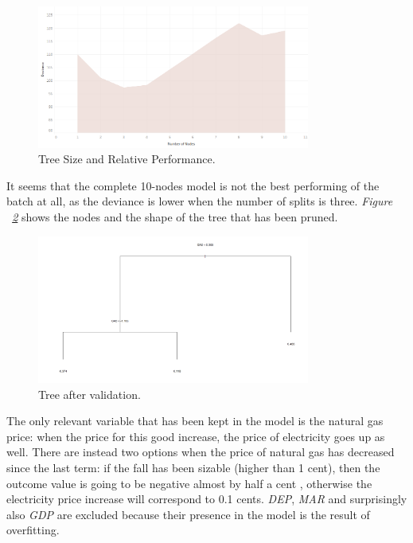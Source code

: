 \documentclass[a4paper,12pt]{book}
\begin{document}
\begin{figure}[tb]
\begin{center}
\captionsetup{justification=centering}
\includegraphics[width=0.8\textwidth]{Images/tre.png}
\caption{Tree Size and Relative Performance.}
\label{fig:tre}
\end{center}
\end{figure}

It seems that the complete 10-nodes model is not the best performing of the batch at all, as the deviance is lower when the number of splits is three. \textit{Figure ~\ref{fig:trep}} shows the nodes and the shape of the tree that has been pruned.

\begin{figure}[tb]
\begin{center}
\captionsetup{justification=centering}
\includegraphics[width=0.8\textwidth]{Images/trep.png}
\caption{Tree after validation.}
\label{fig:trep}
\end{center}
\end{figure}

The only relevant variable that has been kept in the model is the natural gas price: when the price for this good increase, the price of electricity goes up as well. There are instead two options when the price of natural gas has decreased since the last term: if the fall has been sizable (higher than 1 cent), then the outcome value is going to be negative almost by half a cent , otherwise the electricity price increase will correspond to 0.1 cents. \textit{DEP}, \textit{MAR} and surprisingly also \textit{GDP} are excluded because their presence in the model is the result of overfitting.
\end{document}
